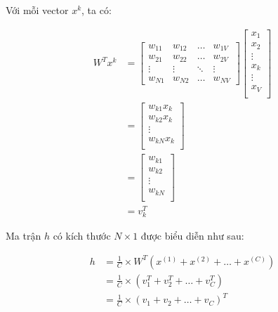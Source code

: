 Với mỗi vector $x^{k}$, ta có:
\begin{center}
    \begin{equation}
        \begin{split}
            W^T x^{k} & =
            \begin{bmatrix}
            w_{11} & w_{12} & \dots & w_{1V}\\
            w_{21} & w_{22} & \dots & w_{2V} \\
            \vdots & \vdots & \ddots & \vdots \\
            w_{N1} & w_{N2} & \dots & w_{NV}
        \end{bmatrix}
        \begin{bmatrix}
            x_{1}\\
            x_{2} \\
            \vdots \\
            x_{k} \\
            \vdots \\
            x_{V} \\
        \end{bmatrix} \\
         & =
        \begin{bmatrix}
            w_{k1}x_{k}\\
            w_{k2}x_{k} \\
            \vdots \\
            w_{kN}x_{k} \\
        \end{bmatrix} \\
         & =
        \begin{bmatrix}
            w_{k1}\\
            w_{k2} \\
            \vdots \\
            w_{kN} \\
        \end{bmatrix} \\
         & = v^T_{k}
        \end{split}
    \end{equation}
\end{center}

Ma trận $h$ có kích thước $N\times 1$ được biểu diễn như sau:

\begin{center}
    \begin{equation}
    \begin{split}
        h & = \frac{1}{C} \times W^T \left( x^{(1)} + x^{(2)} + \dots + x^{(C)} \right) \\
        & = \frac{1}{C} \times \left( v^T_{1} + v^T_{2} + \dots + v^T_{C} \right) \\
        & = \frac{1}{C} \times \left( v_{1} + v_{2} + \dots + v_{C} \right)^T
    \end{split}
    \end{equation}
\end{center}


